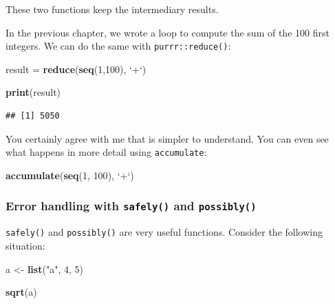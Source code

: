 \documentclass[]{gitbook}
\newenvironment{Shaded}{\begin{snugshade}}{\end{snugshade}}
\newcommand{\DataTypeTok}[1]{\textcolor[rgb]{0.13,0.29,0.53}{#1}}
\newcommand{\DecValTok}[1]{\textcolor[rgb]{0.00,0.00,0.81}{#1}}
\newcommand{\KeywordTok}[1]{\textcolor[rgb]{0.13,0.29,0.53}{\textbf{#1}}}
\newcommand{\NormalTok}[1]{#1}
\newcommand{\StringTok}[1]{\textcolor[rgb]{0.31,0.60,0.02}{#1}}
\begin{document}
These two functions keep the intermediary results.

In the previous chapter, we wrote a loop to compute the sum of the 100 first integers. We can do
the same with \texttt{purrr::reduce()}:

\begin{Shaded}
\begin{Highlighting}[]
\NormalTok{result =}\StringTok{ }\KeywordTok{reduce}\NormalTok{(}\KeywordTok{seq}\NormalTok{(}\DecValTok{1}\NormalTok{,}\DecValTok{100}\NormalTok{), }\StringTok{`}\DataTypeTok{+}\StringTok{`}\NormalTok{)}

\KeywordTok{print}\NormalTok{(result)}
\end{Highlighting}
\end{Shaded}

\begin{verbatim}
## [1] 5050
\end{verbatim}

You certainly agree with me that is simpler to understand. You can even see what happens in more
detail using \texttt{accumulate}:

\begin{Shaded}
\begin{Highlighting}[]
\KeywordTok{accumulate}\NormalTok{(}\KeywordTok{seq}\NormalTok{(}\DecValTok{1}\NormalTok{, }\DecValTok{100}\NormalTok{), }\StringTok{`}\DataTypeTok{+}\StringTok{`}\NormalTok{)}
\end{Highlighting}
\end{Shaded}

\hypertarget{error-handling-with-safely-and-possibly}{%
\subsubsection{\texorpdfstring{Error handling with \texttt{safely()} and \texttt{possibly()}}{Error handling with safely() and possibly()}}\label{error-handling-with-safely-and-possibly}}

\texttt{safely()} and \texttt{possibly()} are very useful functions. Consider the following situation:

\begin{Shaded}
\begin{Highlighting}[]
\NormalTok{a <-}\StringTok{ }\KeywordTok{list}\NormalTok{(}\StringTok{"a"}\NormalTok{, }\DecValTok{4}\NormalTok{, }\DecValTok{5}\NormalTok{)}

\KeywordTok{sqrt}\NormalTok{(a)}
\end{Highlighting}
\end{Shaded}
\end{document}

